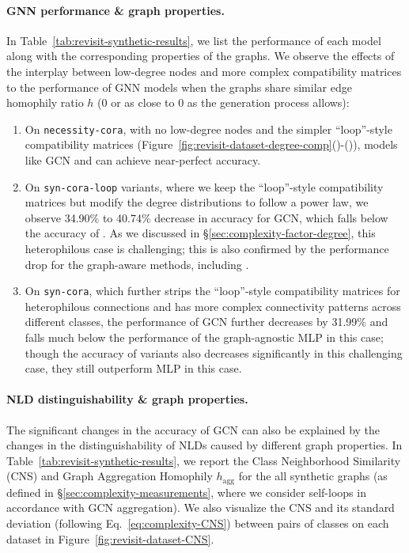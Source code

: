 \paragraph{GNN performance \& graph properties.} In Table~\ref{tab:revisit-synthetic-results}, we list the performance of each model along with the corresponding properties of the graphs.
We observe the effects of the interplay between low-degree nodes and more complex compatibility matrices to the performance of GNN models when the graphs share similar edge homophily ratio $h$ (0 or as close to 0 as the generation process allows):
\begin{enumerate}[label=(\arabic*),nosep]
\item On \texttt{necessity-cora}, with no low-degree nodes and the simpler ``loop''-style compatibility matrices (Figure~\ref{fig:revisit-dataset-degree-comp}()-()), models like GCN and  can achieve near-perfect accuracy.

\item On \texttt{syn-cora-loop} variants, where we keep the ``loop''-style compatibility matrices but modify the degree distributions to follow a power law, we observe 34.90\% to 40.74\% decrease in accuracy for GCN, which falls below the accuracy of \method. As we discussed in \S\ref{sec:complexity-factor-degree}, this heterophilous case is challenging; this is also confirmed by the performance drop for the graph-aware methods, including \method. 

\item On \texttt{syn-cora}, which further strips the ``loop''-style compatibility matrices for heterophilous connections and has more complex connectivity patterns across different classes, the performance of GCN further decreases by 31.99\% and falls much below the performance of the graph-agnostic MLP in this case; though the accuracy of \method variants also decreases significantly in this challenging case, they still outperform MLP in this case.
\end{enumerate}

\paragraph{NLD distinguishability \& graph properties.} The significant changes in the accuracy of GCN can also be explained by the changes in the distinguishability of NLDs caused by different graph properties.
In Table~\ref{tab:revisit-synthetic-results}, we report the Class Neighborhood Similarity (CNS) and Graph Aggregation Homophily $h_{\mathrm{agg}}$ for the all synthetic graphs (as defined in \S\ref{sec:complexity-measurements}, where
we consider self-loops in accordance with GCN aggregation). 
We also visualize the CNS and its standard deviation (following Eq.~\eqref{eq:complexity-CNS}) between pairs of classes on each dataset in Figure~\ref{fig:revisit-dataset-CNS}. 

